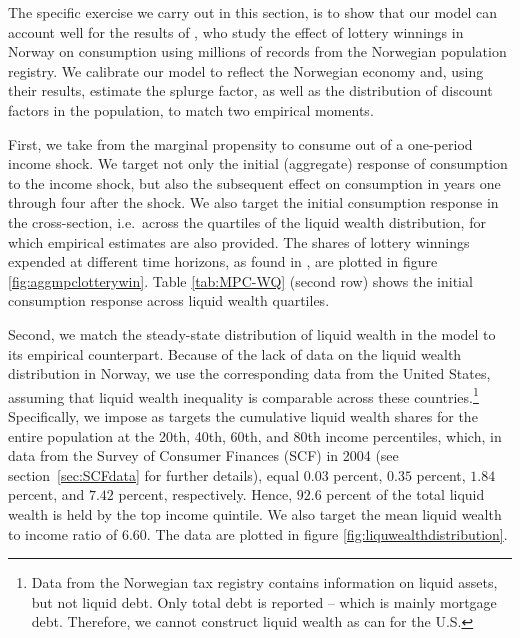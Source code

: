 \documentclass[\PathToRoot/\ProjectName]{subfiles}
\begin{document}
The specific exercise we carry out in this section, is to show that our model can account well for the results of \cite{fagereng-mpc-2021}, who study the effect of lottery winnings in Norway on consumption using millions of records from the Norwegian population registry. We calibrate our model to reflect the Norwegian economy and, using their results, estimate the splurge factor, as well as the distribution of discount factors in the population, to match two empirical moments.

First, we take from \cite{fagereng-mpc-2021} the marginal propensity to consume out of a one-period income shock. We target not only the initial (aggregate) response of consumption to the income shock, but also the subsequent effect on consumption in years one through four after the shock. We also target the initial consumption response in the cross-section, i.e.\ across the quartiles of the liquid wealth distribution, for which empirical estimates are also provided. The shares of lottery winnings expended at different time horizons, as found in \cite{fagereng-mpc-2021}, are plotted in figure \ref{fig:aggmpclotterywin}. Table \ref{tab:MPC-WQ} (second row) shows the initial consumption response across liquid wealth quartiles.%

Second, we match the steady-state distribution of liquid wealth in the model to its empirical counterpart. Because of the lack of data on the liquid wealth distribution in Norway, we use the corresponding data from the United States, assuming that liquid wealth inequality is comparable across these countries.\footnote{Data from the Norwegian tax registry contains information on liquid assets, but not liquid debt. Only total debt is reported -- which is mainly mortgage debt. Therefore, we cannot construct liquid wealth as \cite{kaplan2014model} can for the U.S. \whenintegrated{\label{foot:liqwealth}}}
Specifically, we impose as targets the cumulative liquid wealth shares for the entire population at the 20th, 40th, 60th, and 80th income percentiles, which, in data from the Survey of Consumer Finances (SCF) in 2004 (see section~\ref{sec:SCFdata} for further details), equal $0.03$ percent, $0.35$ percent, $1.84$ percent, and $7.42$ percent, respectively. Hence, $92.6$ percent of the total liquid wealth is held by the top income quintile. We also target the mean liquid wealth to income ratio of 6.60. The data are plotted in figure \ref{fig:liquwealthdistribution}.
\end{document}
